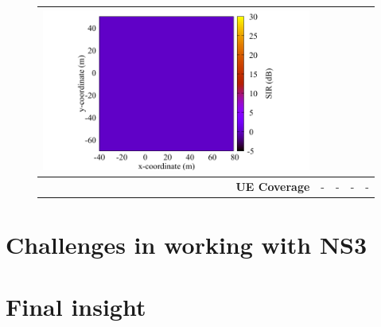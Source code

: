 \documentclass[10pt,a4]{article}
\begin{document}
\begin{figure}[ht!]
{\begin{tabular}{r|cccc}
    \includegraphics[width=0.25\linewidth]{../kpm-plots/nr-rem-UL_COVERAGE_AREA-sir.pdf} \\
    \hline
    \textbf{UE Coverage} &
    - &
    - &
    - &
    - \\
    \end{tabular}}
    \end{figure}
    \section{Challenges in working with NS3}
    \section{Final insight}
\end{document}
